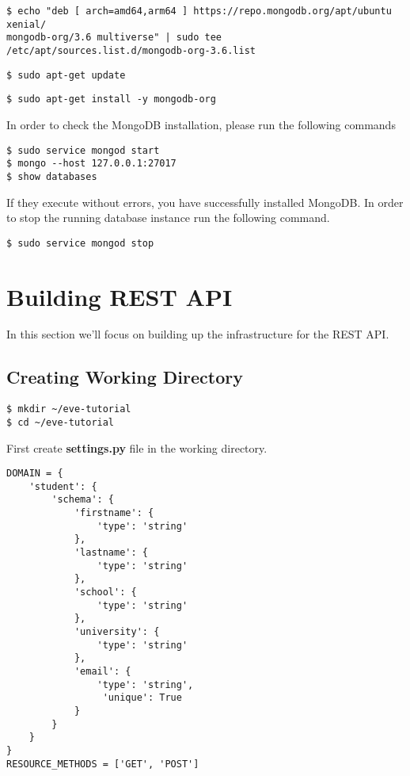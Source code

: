 \documentclass{article}
\begin{document}
\begin{verbatim}
$ echo "deb [ arch=amd64,arm64 ] https://repo.mongodb.org/apt/ubuntu xenial/
mongodb-org/3.6 multiverse" | sudo tee /etc/apt/sources.list.d/mongodb-org-3.6.list
\end{verbatim}

\begin{verbatim}
$ sudo apt-get update
\end{verbatim}

\begin{verbatim}
$ sudo apt-get install -y mongodb-org
\end{verbatim}


In order to check the MongoDB installation, please run the following commands

\begin{verbatim}
$ sudo service mongod start
$ mongo --host 127.0.0.1:27017
$ show databases
\end{verbatim}

If they execute without errors, you have successfully installed MongoDB. In order to stop the running database instance run the following command. 

\begin{verbatim}
$ sudo service mongod stop
\end{verbatim}

\section{Building REST API}

In this section we'll focus on building up the infrastructure for the REST API. 

\subsection{Creating Working Directory}


\begin{verbatim}
$ mkdir ~/eve-tutorial
$ cd ~/eve-tutorial
\end{verbatim}

First create \textbf{settings.py} file in the working directory. 

\begin{verbatim}
DOMAIN = {
    'student': {
        'schema': {
            'firstname': {
                'type': 'string'
            },
            'lastname': {
                'type': 'string'
            },
            'school': {
                'type': 'string'
            },
            'university': {
                'type': 'string'
            },
            'email': {
                'type': 'string',
                 'unique': True
            }
        }
    }
}
RESOURCE_METHODS = ['GET', 'POST']
\end{verbatim}
\end{document}
